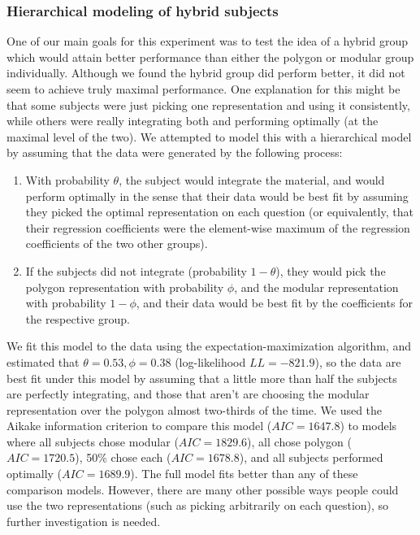 \documentclass[11pt]{article}
\begin{document}
\subsubsection{Hierarchical modeling of hybrid subjects}
One of our main goals for this experiment was to test the idea of a hybrid group which would attain better performance than either the polygon or modular group individually. Although we found the hybrid group did perform better, it did not seem to achieve truly maximal performance. One explanation for this might be that some subjects were just picking one representation and using it consistently, while others were really integrating both and performing optimally (at the maximal level of the two). We attempted to model this with a hierarchical model by assuming that the data were generated by the following process: 
\begin{enumerate}
\item With probability $\theta$, the subject would integrate the material, and would perform optimally in the sense that their data would be best fit by assuming they picked the optimal representation on each question (or equivalently, that their regression coefficients were the element-wise maximum of the regression coefficients of the two other groups). 
\item If the subjects did not integrate (probability $1-\theta$), they would pick the polygon representation with probability $\phi$, and the modular representation with probability $1-\phi$, and their data would be best fit by the coefficients for the respective group.
\end{enumerate} 
We fit this model to the data using the expectation-maximization algorithm, and estimated that $\theta = 0.53, \phi = 0.38$ (log-likelihood $LL=-821.9$), so the data are best fit under this model by assuming that a little more than half the subjects are perfectly integrating, and those that aren't are choosing the modular representation over the polygon almost two-thirds of the time. We used the Aikake information criterion to compare this model ($AIC = 1647.8$) to models where all subjects chose modular ($AIC=1829.6$), all chose polygon ($AIC = 1720.5$), 50\% chose each ($AIC = 1678.8$), and all subjects performed optimally ($AIC = 1689.9$). The full model fits better than any of these comparison models. However, there are many other possible ways people could use the two representations (such as picking arbitrarily on each question), so further investigation is needed.
\end{document}
